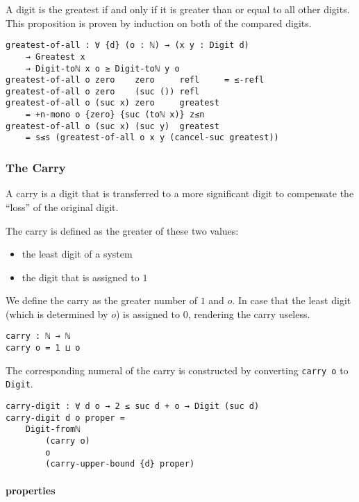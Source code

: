 \documentclass[\main/thesis.tex]{subfiles}
\begin{document}
A digit is the greatest if and only if it is greater than or equal to all other
digits. This proposition is proven by induction on both of the compared digits.

\begin{lstlisting}
greatest-of-all : ∀ {d} (o : ℕ) → (x y : Digit d)
    → Greatest x
    → Digit-toℕ x o ≥ Digit-toℕ y o
greatest-of-all o zero    zero     refl     = ≤-refl
greatest-of-all o zero    (suc ()) refl
greatest-of-all o (suc x) zero     greatest
    = +n-mono o {zero} {suc (toℕ x)} z≤n
greatest-of-all o (suc x) (suc y)  greatest
    = s≤s (greatest-of-all o x y (cancel-suc greatest))
\end{lstlisting}

\subsubsection{The Carry}

A carry is a digit that is transferred to a more significant digit to compensate
the ``loss'' of the original digit.

The carry is defined as the greater of these two values:

\begin{itemize}
    \item the least digit of a system
    \item the digit that is assigned to $ 1 $
\end{itemize}

We define the carry as the greater number of $ 1 $ and $ o $.
In case that the least digit (which is determined by $o$) is assigned to $ 0 $,
rendering the carry useless.

\begin{lstlisting}
carry : ℕ → ℕ
carry o = 1 ⊔ o
\end{lstlisting}

The corresponding numeral of the carry is constructed by converting
{\lstinline|carry o|} to {\lstinline|Digit|}.

\begin{lstlisting}
carry-digit : ∀ d o → 2 ≤ suc d + o → Digit (suc d)
carry-digit d o proper =
    Digit-fromℕ
        (carry o)
        o
        (carry-upper-bound {d} proper)
\end{lstlisting}

\paragraph{properties}
\end{document}
